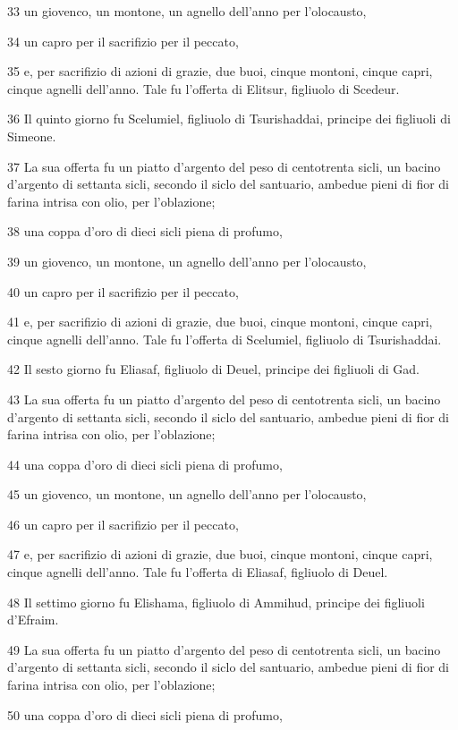 \par 33 un giovenco, un montone, un agnello dell'anno per l'olocausto,
\par 34 un capro per il sacrifizio per il peccato,
\par 35 e, per sacrifizio di azioni di grazie, due buoi, cinque montoni, cinque capri, cinque agnelli dell'anno. Tale fu l'offerta di Elitsur, figliuolo di Scedeur.
\par 36 Il quinto giorno fu Scelumiel, figliuolo di Tsurishaddai, principe dei figliuoli di Simeone.
\par 37 La sua offerta fu un piatto d'argento del peso di centotrenta sicli, un bacino d'argento di settanta sicli, secondo il siclo del santuario, ambedue pieni di fior di farina intrisa con olio, per l'oblazione;
\par 38 una coppa d'oro di dieci sicli piena di profumo,
\par 39 un giovenco, un montone, un agnello dell'anno per l'olocausto,
\par 40 un capro per il sacrifizio per il peccato,
\par 41 e, per sacrifizio di azioni di grazie, due buoi, cinque montoni, cinque capri, cinque agnelli dell'anno. Tale fu l'offerta di Scelumiel, figliuolo di Tsurishaddai.
\par 42 Il sesto giorno fu Eliasaf, figliuolo di Deuel, principe dei figliuoli di Gad.
\par 43 La sua offerta fu un piatto d'argento del peso di centotrenta sicli, un bacino d'argento di settanta sicli, secondo il siclo del santuario, ambedue pieni di fior di farina intrisa con olio, per l'oblazione;
\par 44 una coppa d'oro di dieci sicli piena di profumo,
\par 45 un giovenco, un montone, un agnello dell'anno per l'olocausto,
\par 46 un capro per il sacrifizio per il peccato,
\par 47 e, per sacrifizio di azioni di grazie, due buoi, cinque montoni, cinque capri, cinque agnelli dell'anno. Tale fu l'offerta di Eliasaf, figliuolo di Deuel.
\par 48 Il settimo giorno fu Elishama, figliuolo di Ammihud, principe dei figliuoli d'Efraim.
\par 49 La sua offerta fu un piatto d'argento del peso di centotrenta sicli, un bacino d'argento di settanta sicli, secondo il siclo del santuario, ambedue pieni di fior di farina intrisa con olio, per l'oblazione;
\par 50 una coppa d'oro di dieci sicli piena di profumo,
